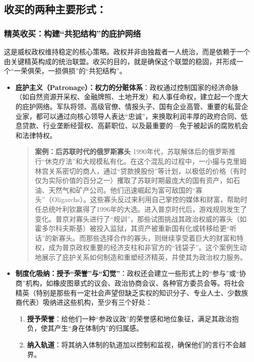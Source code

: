 \subsection{收买的两种主要形式：}

\subsubsection*{精英收买：构建“共犯结构”的庇护网络}

这是威权政权维持稳定的核心策略。政权并非由独裁者一人统治，而是依赖于一个由关键精英构成的统治联盟。收买的目的，就是确保这个联盟的稳固，并形成一个“一荣俱荣，一损俱损”的“共犯结构”。

\begin{itemize}
    \item \textbf{庇护主义（Patronage）：权力的分赃体系}：政权通过控制国家的经济命脉（如自然资源开采权、金融牌照、土地开发）和人事任命权，建立起一个庞大的庇护网络。军队将领、高级官僚、情报头子、国有企业高管、重要的私营企业家，都可以通过向核心领导人表达“忠诚”，来换取利润丰厚的政府合同、低息贷款、行业垄断经营权、高薪职位、以及最重要的---免于被起诉的腐败机会和法律特权。
    \begin{quote}
    \textbf{案例：后苏联时代的俄罗斯寡头}
    1990年代，苏联解体后的俄罗斯推行“休克疗法”和大规模私有化。在这个混乱的过程中，一小撮与克里姆林宫关系密切的商人，通过“贷款换股份”等计划，以极低的价格（有时仅为实际价值的百分之一）攫取了苏联时期最庞大的国有资产，如石油、天然气和矿产公司。他们迅速崛起为富可敌国的“寡头”（Oligarchs）。这些寡头反过来利用自己掌控的媒体和财富，帮助时任总统叶利钦赢得了1996年的大选。进入普京时代后，游戏规则发生了变化。普京对寡头进行了“规训”，那些试图挑战其政治权威的寡头（如霍多尔科夫斯基）被投入监狱，其资产被重新国有化或转移给更“听话”的新寡头。而那些选择合作的寡头，则继续享受着巨大的财富和特权，成为普京政权重要的经济支柱和非官方的“钱袋子”。这个案例生动地展示了庇护关系如何制造和重塑经济精英，并使其为政治权力服务。
    \end{quote}
    \item \textbf{制度化吸纳：授予“荣誉”与“幻觉”}：政权还会建立一些形式上的“参与”或“协商”机构，如橡皮图章式的议会、政治协商会议、各种官方委员会等。将社会精英（特别是那些有一定社会声望但缺乏实权的知识分子、专业人士、少数族裔代表）吸纳进这些机构，至少有三个好处：
    \begin{enumerate}
        \item \textbf{授予荣誉}：给他们一种“参政议政”的荣誉感和地位象征，满足其政治抱负，使其产生“身在体制内”的归属感。
        \item \textbf{纳入轨道}：将其纳入体制的轨道加以控制和监视，确保他们的言行不会越界。

\end{enumerate}
\end{itemize}
